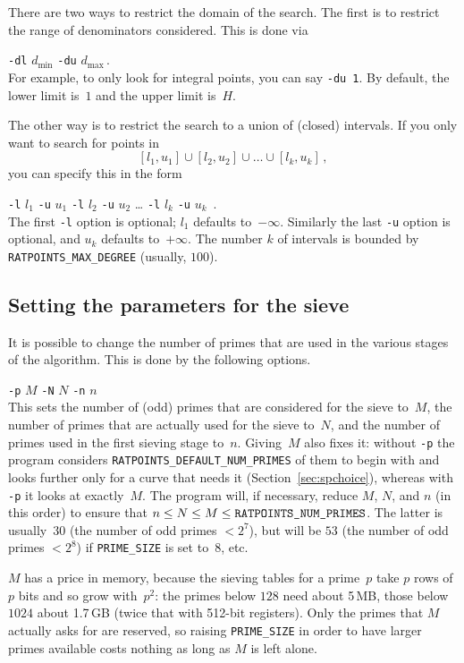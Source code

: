 \documentclass[12pt,a4paper,oneside]{amsart}
\begin{document}
There are two ways to restrict the domain of the search. The first is
to restrict the range of denominators considered. This is done via \\
\strut\quad\verb+-dl+ $d_{\text{min}}$ \verb+-du+ $d_{\text{max}}$\,. \\
For example, to only look for integral points, you can say \verb+-du 1+.
By default, the lower limit is~$1$ and the upper limit is~$H$.

The other way is to restrict the search to a union of (closed) intervals.
If you only want to search for points in
\[ [l_1, u_1] \cup [l_2, u_2] \cup \dots \cup [l_k, u_k] \,, \]
you can specify this in the form \\
\strut\quad\verb+-l+ $l_1$ \verb+-u+ $u_1$ \verb+-l+ $l_2$ \verb+-u+ $u_2$ \dots
\verb+-l+ $l_k$ \verb+-u+ $u_k$ \,. \\
The first \verb+-l+ option is optional; $l_1$ defaults to~$-\infty$.
Similarly the last \verb+-u+ option is optional, and $u_k$ defaults
to~$+\infty$. The number $k$ of intervals is bounded by
\texttt{RATPOINTS\_MAX\_DEGREE} (usually, $100$).

\subsection{Setting the parameters for the sieve} \label{fd}

It is possible to change the number of primes that are used in the various
stages of the algorithm. This is done by the following options. \\
\strut\quad\verb+-p+ $M$ \verb+-N+ $N$ \verb+-n+ $n$ \\
This sets the number of (odd) primes that are considered for the sieve
to~$M$, the number of primes that are actually used for the sieve to~$N$,
and the number of primes used in the first sieving stage to~$n$. Giving~$M$
also fixes it: without \verb+-p+ the program considers
\texttt{RATPOINTS\_DEFAULT\_NUM\_PRIMES} of them to begin with and looks
further only for a curve that needs it (Section~\ref{sec:spchoice}), whereas
with \verb+-p+ it looks at exactly~$M$. The program
will, if necessary, reduce $M$, $N$, and $n$ (in this order) to ensure
that $n \le N \le M \le \text{\texttt{RATPOINTS\_NUM\_PRIMES}}$. The latter
is usually~$30$ (the number of odd primes $< 2^7$), but will be $53$
(the number of odd primes $< 2^8$) if \texttt{PRIME\_SIZE} is set to~$8$, etc.

$M$ has a price in memory, because the sieving tables for a prime~$p$ take
$p$ rows of $p$ bits and so grow with~$p^2$: the primes below $128$ need about
5\,MB, those below $1024$ about 1.7\,GB (twice that with 512-bit registers).
Only the primes that $M$ actually asks for are reserved, so raising
\texttt{PRIME\_SIZE} in order to have larger primes available costs nothing as
long as $M$ is left alone.
\end{document}
